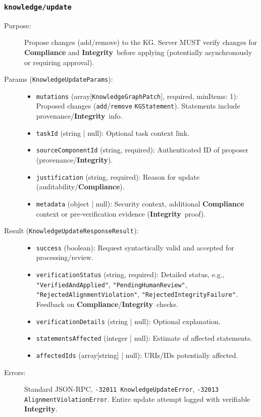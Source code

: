 \documentclass[12pt,a4paper]{report}
\newcommand{\Integrity}{\textbf{Integrity}}
\begin{document}
	\subsubsection{\texttt{knowledge/update}}
	\label{app:oami_kg_update}
	\begin{description}
		\item[Purpose:] Propose changes (add/remove) to the KG. Server MUST verify changes for \textbf{Compliance} and \Integrity\ before applying (potentially asynchronously or requiring approval).
		\item[Params (\texttt{KnowledgeUpdateParams}):]
		\begin{itemize} \itemsep0em
			\item \texttt{mutations} (array[\texttt{KnowledgeGraphPatch}], required, minItems: 1): Proposed changes (\texttt{add}/\texttt{remove} \texttt{KGStatement}). Statements include provenance/\Integrity\ info.
			\item \texttt{taskId} (string | null): Optional task context link.
			\item \texttt{sourceComponentId} (string, required): Authenticated ID of proposer (provenance/\Integrity).
			\item \texttt{justification} (string, required): Reason for update (auditability/\textbf{Compliance}).
			\item \texttt{metadata} (object | null): Security context, additional \textbf{Compliance} context or pre-verification evidence (\Integrity\ proof).
		\end{itemize}
		\item[Result (\texttt{KnowledgeUpdateResponseResult}):]
		\begin{itemize} \itemsep0em
			\item \texttt{success} (boolean): Request syntactically valid and accepted for processing/review.
			\item \texttt{verificationStatus} (string, required): Detailed status, e.g., \texttt{"VerifiedAndApplied"}, \texttt{"PendingHumanReview"}, \texttt{"RejectedAlignmentViolation"}, \texttt{"RejectedIntegrityFailure"}. Feedback on \textbf{Compliance}/\Integrity\ checks.
			\item \texttt{verificationDetails} (string | null): Optional explanation.
			\item \texttt{statementsAffected} (integer | null): Estimate of affected statements.
			\item \texttt{affectedIds} (array[string] | null): URIs/IDs potentially affected.
		\end{itemize}
		\item[Errors:] Standard JSON-RPC, \texttt{-32011 KnowledgeUpdateError}, \texttt{-32013 AlignmentViolationError}. Entire update attempt logged with verifiable \Integrity.
	\end{description}
	
\end{document}
